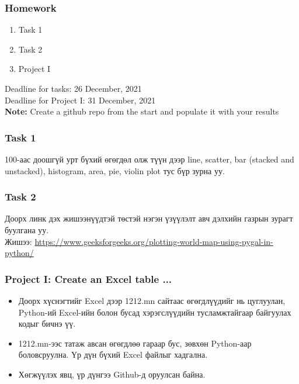 \documentclass{beamer}
\begin{document}
\begin{frame}
    \frametitle{Homework}
    \begin{enumerate}
        \item Task 1
        \item Task 2
        \item Project I
    \end{enumerate}
    \vskip 2mm
    Deadline for tasks: 26 December, 2021 \\
    Deadline for Project I: 31 December, 2021 \\

\vfill
\textbf{Note:} Create a github repo from the start and populate it with your results
\end{frame}

\begin{frame}
    \frametitle{Task 1}
    100-аас доошгүй урт бүхий өгөгдөл олж түүн дээр 
    line, scatter, bar (stacked and unstacked), histogram,
    area, pie, violin plot тус бүр зурна уу.
\end{frame}

\begin{frame}
    \frametitle{Task 2}
    Доорх линк дэх жишээнүүдтэй төстэй нэгэн үзүүлэлт
    авч дэлхийн газрын зурагт буулгана уу. \\
    Жишээ:
	\url{https://www.geeksforgeeks.org/plotting-world-map-using-pygal-in-python/}
\end{frame}

\begin{frame}
    \frametitle{Project I: Create an Excel table ...}
    \begin{itemize}
        \item Доорх хүснэгтийг Excel дээр 1212.mn сайтаас өгөгдлүүдийг нь цуглуулан, 
        Python-ий Excel-ийн болон бусад хэрэгслүүдийн тусламжтайгаар 
        байгуулах кодыг бичнэ үү. 
        \item 1212.mn-ээс татаж авсан өгөгдлөө гараар бус, зөвхөн Python-аар
        боловсруулна. Үр дүн бүхий Excel файлыг хадгална.
        \item Хөгжүүлэх явц, үр дүнгээ Github-д оруулсан байна.        
    \end{itemize}

\end{frame}
\end{document}
